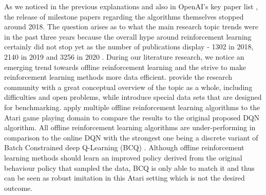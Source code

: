 \par
As we noticed in the previous explanations and also in OpenAI's key paper list \cite[]{keypaperlist}, the release of milestone papers regarding the algorithms themselves stopped around 2018. The question arises as to what the main research topic trends were in the past three years because the overall hype around reinforcement learning certainly did not stop yet as the number of publications display - 1302 in 2018, 2140 in 2019 and 3256 in 2020 \cite[]{arxiv}. During our literature research, we notice an emerging trend towards offline reinforcement learning and the strive to make reinforcement learning methods more data efficient. \cite{levine2020offline} provide the research community with a great conceptual overview of the topic as a whole, including difficulties and open problems, while \cite{fu2021d4rl} introduce special data sets that are designed for benchmarking. \cite{fujimoto2019benchmarking} apply multiple offline reinforcement learning algorithms to the Atari game playing domain to compare the results to the original proposed DQN algorithm. All offline reinforcement learning algorithms are under-performing in comparison to the online DQN with the strongest one being a discrete variant of Batch Constrained deep Q-Learning (BCQ) \cite[pp.~7-9]{fujimoto2019benchmarking}. Although offline reinforcement learning methods should learn an improved policy derived from the original behaviour policy that sampled the data, BCQ is only able to match it and thus can be seen as robust imitation in this Atari setting \cite[pp.~7]{fujimoto2019benchmarking} which is not the desired outcome.
\par
